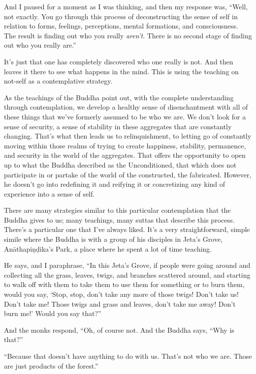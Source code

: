 And I paused for a moment as I was thinking, and then my response was, ``Well, not exactly. You go through this process of deconstructing the sense of self in relation to forms, feelings, perceptions, mental formations, and consciousness. The result is finding out who you really \emph{aren't}. There is no second stage of finding out who you really are.''

It's just that one has completely discovered who one really is not. And then leaves it there to see what happens in the mind. This is using the teaching on not-self as a contemplative strategy.

As the teachings of the Buddha point out, with the complete understanding through contemplation, we develop a healthy sense of disenchantment with all of these things that we've formerly assumed to be who we are. We don't look for a sense of security, a sense of stability in these aggregates that are constantly changing. That's what then leads us to relinquishment, to letting go of constantly moving within those realms of trying to create happiness, stability, permanence, and security in the world of the aggregates. That offers the opportunity to open up to what the Buddha described as the Unconditioned, that which does not participate in or partake of the world of the constructed, the fabricated. However, he doesn't go into redefining it and reifying it or concretizing any kind of experience into a sense of self.~

There are many strategies similar to this particular contemplation that the Buddha gives to us; many teachings, many suttas that describe this process. There's a particular one that I've always liked. It's a very straightforward, simple simile where the Buddha is with a group of his disciples in Jeta's Grove, Anāthapiṇḍika's Park, a place where he spent a lot of time teaching.

He says, and I paraphrase, ``In this Jeta's Grove, if people were going around and collecting all the grass, leaves, twigs, and branches scattered around, and starting to walk off with them to take them to use them for something or to burn them, would you say, `Stop, stop, don't take any more of those twigs! Don't take us! Don't take me! Those twigs and grass and leaves, don't take me away! Don't burn me!' Would you say that?''

And the monks respond, ``Oh, of course not. And the Buddha says, ``Why is that?''~

``Because that doesn't have anything to do with us. That's not who we are. Those are just products of the forest.''

